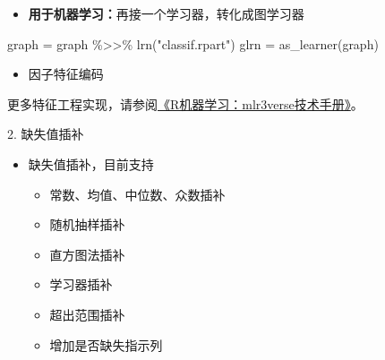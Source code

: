 \documentclass[
  11pt,
  ignorenonframetext,
  dvipsnames,UTF8]{beamer}
\newenvironment{Shaded}{\begin{snugshade}}{\end{snugshade}}
\newcommand{\AttributeTok}[1]{\textcolor[rgb]{0.77,0.63,0.00}{#1}}
\newcommand{\CommentTok}[1]{\textcolor[rgb]{0.56,0.35,0.01}{\textit{#1}}}
\newcommand{\DecValTok}[1]{\textcolor[rgb]{0.00,0.00,0.81}{#1}}
\newcommand{\FunctionTok}[1]{\textcolor[rgb]{0.00,0.00,0.00}{#1}}
\newcommand{\NormalTok}[1]{#1}
\newcommand{\OtherTok}[1]{\textcolor[rgb]{0.56,0.35,0.01}{#1}}
\newcommand{\SpecialCharTok}[1]{\textcolor[rgb]{0.00,0.00,0.00}{#1}}
\newcommand{\StringTok}[1]{\textcolor[rgb]{0.31,0.60,0.02}{#1}}
\providecommand{\tightlist}{%
  \setlength{\itemsep}{0pt}\setlength{\parskip}{0pt}}
\begin{document}
\begin{frame}[fragile]{}
\protect\hypertarget{section-18}{}
\begin{itemize}
\tightlist
\item
  \textbf{用于机器学习：}再接一个学习器，转化成图学习器
\end{itemize}

\begin{Shaded}
\begin{Highlighting}[]
\NormalTok{graph }\OtherTok{=}\NormalTok{ graph }\SpecialCharTok{\%\textgreater{}\textgreater{}\%} \FunctionTok{lrn}\NormalTok{(}\StringTok{"classif.rpart"}\NormalTok{)}
\NormalTok{glrn }\OtherTok{=} \FunctionTok{as\_learner}\NormalTok{(graph)}
\end{Highlighting}
\end{Shaded}
\end{frame}

\begin{frame}[fragile]{}
\protect\hypertarget{section-19}{}
\begin{itemize}
\tightlist
\item
  因子特征编码
\end{itemize}

\begin{Shaded}
\end{Shaded}

更多特征工程实现，请参阅\href{https://gitee.com/zhjx19/rconf15}{《R机器学习：mlr3verse技术手册》}\citep{mlr3manual}。
\end{frame}

\begin{frame}{2. 缺失值插补}
\protect\hypertarget{ux7f3aux5931ux503cux63d2ux8865}{}
\begin{itemize}
\tightlist
\item
  缺失值插补，目前支持

  \begin{itemize}
  \tightlist
  \item
    常数、均值、中位数、众数插补
  \item
    随机抽样插补
  \item
    直方图法插补
  \item
    学习器插补
  \item
    超出范围插补
  \item
    增加是否缺失指示列
  \end{itemize}
\end{itemize}
\end{frame}
\end{document}
